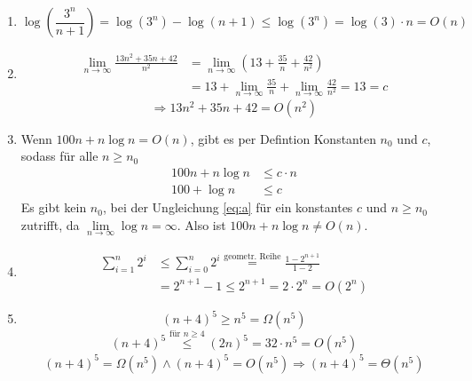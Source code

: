 \documentclass[11pt,a4paper]{article}
\begin{document}
\begin{loesung}
\begin{enumerate}
    \item
    \begin{equation}
        \log\left(\frac{3^n}{n + 1}\right) = \log(3^n) - \log(n + 1)
        \leq \log(3^n) = \log(3) \cdot n = O(n)
    \end{equation}

    \item 
    \begin{align}
        \lim\limits_{n \rightarrow \infty} \frac{13n^2 + 35n + 42}{n^2} &= \lim\limits_{n \rightarrow \infty} \left(13 + \frac{35}{n} + \frac{42}{n^2}\right) \\
        &= 13 + \lim\limits_{n \rightarrow \infty} \frac{35}{n} + \lim\limits_{n \rightarrow \infty} \frac{42}{n^2} = 13 = c
    \end{align}
    \begin{equation}
        \Rightarrow 13n^2 + 35n + 42 = O(n^2)
    \end{equation}

    \item
    Wenn $100n + n \log n = O(n)$, gibt es per Defintion Konstanten $n_0$ und $c$, sodass für alle $n \geq n_0$
    \begin{align}
        100n + n \log n &\leq c\cdot n  \\
        \label{eq:a}
        100 + \log n &\leq c
    \end{align}
    Es gibt kein $n_0$, bei der Ungleichung \ref{eq:a} für ein konstantes $c$ und $n \geq n_0$ zutrifft, da $\lim\limits_{n \rightarrow \infty} \log n = \infty$.
    Also ist $100n + n \log n \neq O(n)$.
    
    \item
    \begin{align}
        \sum\limits_{i=1}^{n} 2^i &\leq \sum\limits_{i=0}^{n} 2^i
        \overset{\text{geometr. Reihe}}{=} \frac{1 - 2^{n+1}}{1 - 2} \\
        &= 2^{n+1} - 1 \leq 2^{n+1} = 2 \cdot 2^n = O(2^n)
    \end{align}

    \item
    \begin{equation}
        (n+4)^5 \geq n^5 = \Omega(n^5)
    \end{equation}
    \begin{equation}
        (n+4)^5 \overset{\text{für }n \geq 4}{\leq} (2n)^5 = 32 \cdot n ^5 = O(n^5)
    \end{equation}
    \begin{equation}
        (n+4)^5 = \Omega(n^5) \wedge (n+4)^5 = O(n^5) \Rightarrow (n+4)^5 = \Theta(n^5)
    \end{equation}


\end{enumerate}
\end{loesung}
\end{document}
